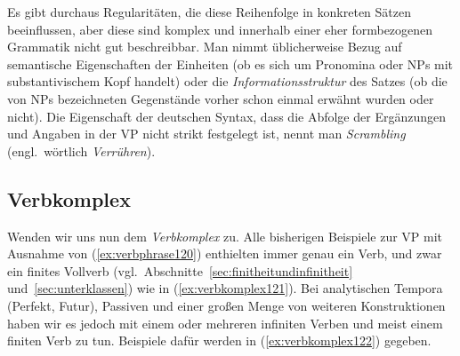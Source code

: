 Es gibt durchaus Regularitäten, die diese Reihenfolge in konkreten Sätzen beeinflussen, aber diese sind komplex und innerhalb einer eher formbezogenen Grammatik nicht gut beschreibbar.
Man nimmt üblicherweise Bezug auf semantische Eigenschaften der Einheiten (\zB ob es sich um Pronomina oder NPs mit substantivischem Kopf handelt) oder die \textit{Informationsstruktur} des Satzes (\zB ob die von NPs bezeichneten Gegenstände vorher schon einmal erwähnt wurden oder nicht).
Die Eigenschaft der deutschen Syntax, dass die Abfolge der Ergänzungen und Angaben in der VP nicht strikt festgelegt ist, nennt man \textit{Scrambling} (engl.\ wörtlich \textit{Verrühren}).



\subsection{Verbkomplex}
\label{sec:verbkomplex}


Wenden wir uns nun dem \textit{Verbkomplex} zu.
Alle bisherigen Beispiele zur VP mit Ausnahme von (\ref{ex:verbphrase120}) enthielten immer genau ein Verb, und zwar ein finites Vollverb (vgl.\ Abschnitte~\ref{sec:finitheitundinfinitheit} und~\ref{sec:unterklassen}) wie in (\ref{ex:verbkomplex121}).
Bei analytischen Tempora (Perfekt, Futur), Passiven und einer großen Menge von weiteren Konstruktionen haben wir es jedoch mit einem oder mehreren infiniten Verben und meist einem finiten Verb zu tun.
Beispiele dafür werden in (\ref{ex:verbkomplex122}) gegeben.


\begin{exe}
  \ex\label{ex:verbkomplex122}
  \begin{xlist}
  \end{xlist}
\end{exe}


